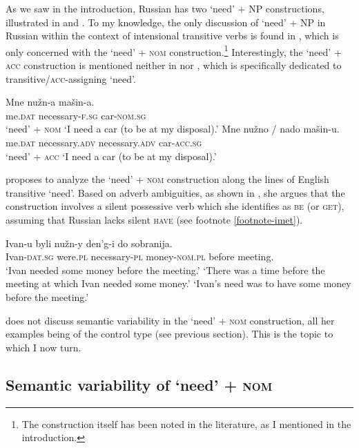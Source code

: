 \documentclass[output=paper,colorlinks,citecolor=brown]{langscibook}
\begin{document}
As we saw in the introduction, Russian has two `need' + NP constructions, illustrated in  and . To my knowledge, the only discussion of `need' + NP in Russian within the context of intensional transitive verbs is found in \citet{Harves2008}, which is only concerned with the `need' + \textsc{nom} construction.\footnote{The construction itself has been noted in the literature, as I mentioned in the introduction.} Interestingly, the `need' + \textsc{acc} construction is mentioned neither in \citet{Harves2008} nor \citet{Harves.Kayne2012}, which is specifically dedicated to transitive/\textsc{acc}-assigning `need'.

\ea
\ea \gll Mne nužn-a mašin-a.\\
     me.\textsc{dat} necessary-\textsc{f.sg} car-\textsc{nom.sg}\\ \hfill `need' + \textsc{nom}
\glt `I need a car (to be at my disposal).'\label{need-nom-rep}
\ex \gll Mne nužno / nado mašin-u.\\
     me.\textsc{dat} necessary.\textsc{adv} {} necessary.\textsc{adv} car-\textsc{acc.sg}\\ \hfill `need' + \textsc{acc}
\glt `I need a car (to be at my disposal).'\label{need-acc-rep}
\z \z

\noindent \citet{Harves2008} proposes to analyze the `need' + \textsc{nom} construction along the lines of English transitive `need'. Based on adverb ambiguities, as shown in , she argues that the construction involves a silent possessive verb which she identifies as \textsc{be} (or \textsc{get}), assuming that Russian lacks silent \textsc{have} (see footnote \ref{footnote-imet}).

\ea \gll Ivan-u byli nužn-y den'g-i do sobranija.\\
Ivan-\textsc{dat.sg} were.\textsc{pl} necessary-\textsc{pl} money-\textsc{nom.pl} before  meeting.\\
\glt `Ivan needed some money before the meeting.'
\ea `There was a time before the meeting at which Ivan needed some money.'
\ex `Ivan's need was to have some money before the meeting.'\\
\hfill \citep[216]{Harves2008}
\label{nuzhen-harves}
\z\z

\noindent \citet{Harves2008} does not discuss semantic variability in the `need' + \textsc{nom} construction, all her examples being of the control type (see previous section). This is the topic to which I now turn.

\subsection{Semantic variability of `need' + \textsc{nom}}\label{section-nom-variability}
\end{document}
